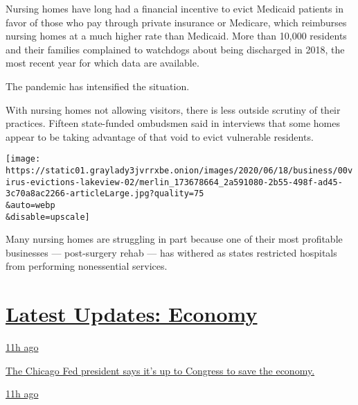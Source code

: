 Nursing homes have long had a financial incentive to evict Medicaid
patients in favor of those who pay through private insurance or
Medicare, which reimburses nursing homes at a much higher rate than
Medicaid. More than 10,000 residents and their families complained to
watchdogs about being discharged in 2018, the most recent year for which
data are available.

The pandemic has intensified the situation.

With nursing homes not allowing visitors, there is less outside scrutiny
of their practices. Fifteen state-funded ombudsmen said in interviews
that some homes appear to be taking advantage of that void to evict
vulnerable residents.

\texttt{[image: https://static01.graylady3jvrrxbe.onion/images/2020/06/18/business/00virus-evictions-lakeview-02/merlin\_173678664\_2a591080-2b55-498f-ad45-3c70a8ac2266-articleLarge.jpg?quality=75\\\&auto=webp\\\&disable=upscale]}

Many nursing homes are struggling in part because one of their most
profitable businesses --- post-surgery rehab --- has withered as states
restricted hospitals from performing nonessential services.

\hypertarget{latest-updates-economy}{%
\section{\texorpdfstring{\href{https://www.nytimes3xbfgragh.onion/live/2020/08/03/business/stock-market-today-coronavirus?action=click\&pgtype=Article\&state=default\&region=MAIN_CONTENT_1\&context=storylines_live_updates}{Latest
Updates:
Economy}}{Latest Updates: Economy}}\label{latest-updates-economy}}

\href{https://www.nytimes3xbfgragh.onion/live/2020/08/03/business/stock-market-today-coronavirus?action=click\&pgtype=Article\&state=default\&region=MAIN_CONTENT_1\&context=storylines_live_updates\#the-chicago-fed-president-says-its-up-to-congress-to-save-the-economy}{11h
ago}

\href{https://www.nytimes3xbfgragh.onion/live/2020/08/03/business/stock-market-today-coronavirus?action=click\&pgtype=Article\&state=default\&region=MAIN_CONTENT_1\&context=storylines_live_updates\#the-chicago-fed-president-says-its-up-to-congress-to-save-the-economy}{The
Chicago Fed president says it's up to Congress to save the economy.}

\href{https://www.nytimes3xbfgragh.onion/live/2020/08/03/business/stock-market-today-coronavirus?action=click\&pgtype=Article\&state=default\&region=MAIN_CONTENT_1\&context=storylines_live_updates\#faa-says-boeing-has-effectively-mitigated-defects-in-the-737-max}{11h
ago}


